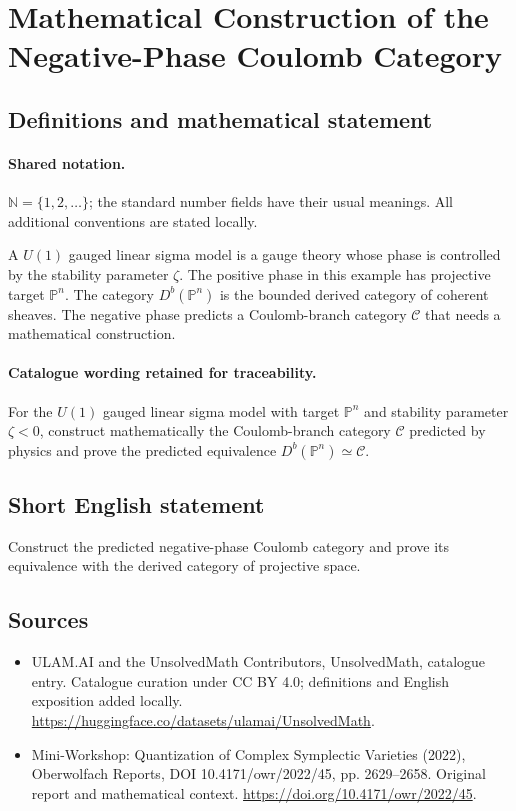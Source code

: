 \documentclass[11pt]{article}
\begin{document}
\section{Mathematical Construction of the Negative-Phase Coulomb Category}\label{statement}

\subsection{Definitions and mathematical statement}

\paragraph{Shared notation.}$\mathbb N=\{1,2,\ldots\}$; the standard number fields have their usual meanings. All additional conventions are stated locally.


A $U(1)$ gauged linear sigma model is a gauge theory whose phase is controlled by the stability parameter $\zeta$. The positive phase in this example has projective target $\mathbb P^n$. The category $D^b(\mathbb P^n)$ is the bounded derived category of coherent sheaves. The negative phase predicts a Coulomb-branch category $\mathcal C$ that needs a mathematical construction.

\paragraph{Catalogue wording retained for traceability.}
For the $U(1)$ gauged linear sigma model with target $\mathbb P^n$ and stability parameter $\zeta<0$, construct mathematically the Coulomb-branch category $\mathcal C$ predicted by physics and prove the predicted equivalence $D^b(\mathbb P^n)\simeq\mathcal C$.
\subsection{Short English statement}
Construct the predicted negative-phase Coulomb category and prove its equivalence with the derived category of projective space.
\subsection{Sources}
\begin{itemize}
\item[\hypertarget{source:statement:1}{S1}] ULAM.AI and the UnsolvedMath Contributors, UnsolvedMath, catalogue entry. Catalogue curation under CC BY 4.0; definitions and English exposition added locally.
\url{https://huggingface.co/datasets/ulamai/UnsolvedMath}.
\item[\hypertarget{source:statement:2}{S2}] Mini-Workshop: Quantization of Complex Symplectic Varieties (2022), Oberwolfach Reports, DOI 10.4171/owr/2022/45, pp. 2629--2658. Original report and mathematical context.
\url{https://doi.org/10.4171/owr/2022/45}.
\end{itemize}
\label{end:statement}
\end{document}
